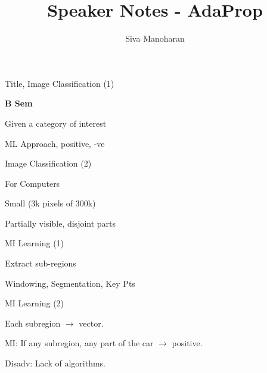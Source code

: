 \documentclass[13pt,handout]{beamer}
\author{Siva Manoharan}
\title{Speaker Notes - AdaProp}
\newenvironment{wideitemize}{\itemize\addtolength{\itemsep}{20pt}}{\enditemize}
\begin{document}
\Huge

\begin{frame}{Title, Image Classification (1)}
    \begin{wideitemize}
    \item {\bf B Sem}
    \item Given a category of interest
    \item ML Approach, positive, -ve
    \end{wideitemize}
\end{frame}

\begin{frame}{Image Classification (2)}
    \begin{wideitemize}
    \item For Computers
    \item Small (3k pixels of 300k)
    \item Partially visible, disjoint parts
    \end{wideitemize}
\end{frame}

\begin{frame}{MI Learning (1)}
    \begin{wideitemize}
    \item Extract sub-regions
    \item Windowing, Segmentation, Key Pts
    \end{wideitemize}
\end{frame}

\begin{frame}{MI Learning (2)}
\begin{wideitemize}
    \item Each subregion $\to$ vector.
    \item MI: If any subregion, any part of the car $\to$ positive.
    \item Disadv: Lack of algorithms.
\end{wideitemize}
\end{frame}
\end{document}
